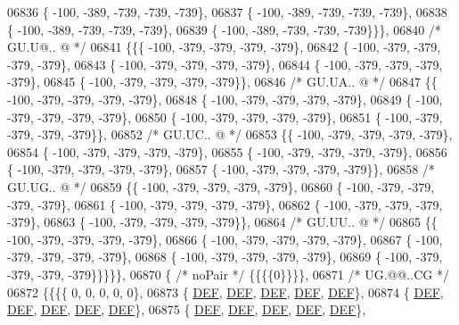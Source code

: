 \begin{DoxyCode}
06836 \{ -100, -389, -739, -739, -739\},
06837 \{ -100, -389, -739, -739, -739\},
06838 \{ -100, -389, -739, -739, -739\},
06839 \{ -100, -389, -739, -739, -739\}\}\},
06840 \textcolor{comment}{/* GU.U@.. @ */}
06841 \{\{\{ -100, -379, -379, -379, -379\},
06842 \{ -100, -379, -379, -379, -379\},
06843 \{ -100, -379, -379, -379, -379\},
06844 \{ -100, -379, -379, -379, -379\},
06845 \{ -100, -379, -379, -379, -379\}\},
06846 \textcolor{comment}{/* GU.UA.. @ */}
06847 \{\{ -100, -379, -379, -379, -379\},
06848 \{ -100, -379, -379, -379, -379\},
06849 \{ -100, -379, -379, -379, -379\},
06850 \{ -100, -379, -379, -379, -379\},
06851 \{ -100, -379, -379, -379, -379\}\},
06852 \textcolor{comment}{/* GU.UC.. @ */}
06853 \{\{ -100, -379, -379, -379, -379\},
06854 \{ -100, -379, -379, -379, -379\},
06855 \{ -100, -379, -379, -379, -379\},
06856 \{ -100, -379, -379, -379, -379\},
06857 \{ -100, -379, -379, -379, -379\}\},
06858 \textcolor{comment}{/* GU.UG.. @ */}
06859 \{\{ -100, -379, -379, -379, -379\},
06860 \{ -100, -379, -379, -379, -379\},
06861 \{ -100, -379, -379, -379, -379\},
06862 \{ -100, -379, -379, -379, -379\},
06863 \{ -100, -379, -379, -379, -379\}\},
06864 \textcolor{comment}{/* GU.UU.. @ */}
06865 \{\{ -100, -379, -379, -379, -379\},
06866 \{ -100, -379, -379, -379, -379\},
06867 \{ -100, -379, -379, -379, -379\},
06868 \{ -100, -379, -379, -379, -379\},
06869 \{ -100, -379, -379, -379, -379\}\}\}\}\},
06870 \{ \textcolor{comment}{/* noPair */} \{\{\{\{0\}\}\}\},
06871 \textcolor{comment}{/* UG.@@..CG */}
06872 \{\{\{\{    0,    0,    0,    0,    0\},
06873 \{  \mbox{\hyperlink{1_88_84__epars_8h_a397419fc12b37ed479c8abb9d444d843}{DEF}},  \mbox{\hyperlink{1_88_84__epars_8h_a397419fc12b37ed479c8abb9d444d843}{DEF}},  \mbox{\hyperlink{1_88_84__epars_8h_a397419fc12b37ed479c8abb9d444d843}{DEF}},  \mbox{\hyperlink{1_88_84__epars_8h_a397419fc12b37ed479c8abb9d444d843}{DEF}},  \mbox{\hyperlink{1_88_84__epars_8h_a397419fc12b37ed479c8abb9d444d843}{DEF}}\},
06874 \{  \mbox{\hyperlink{1_88_84__epars_8h_a397419fc12b37ed479c8abb9d444d843}{DEF}},  \mbox{\hyperlink{1_88_84__epars_8h_a397419fc12b37ed479c8abb9d444d843}{DEF}},  \mbox{\hyperlink{1_88_84__epars_8h_a397419fc12b37ed479c8abb9d444d843}{DEF}},  \mbox{\hyperlink{1_88_84__epars_8h_a397419fc12b37ed479c8abb9d444d843}{DEF}},  \mbox{\hyperlink{1_88_84__epars_8h_a397419fc12b37ed479c8abb9d444d843}{DEF}}\},
06875 \{  \mbox{\hyperlink{1_88_84__epars_8h_a397419fc12b37ed479c8abb9d444d843}{DEF}},  \mbox{\hyperlink{1_88_84__epars_8h_a397419fc12b37ed479c8abb9d444d843}{DEF}},  \mbox{\hyperlink{1_88_84__epars_8h_a397419fc12b37ed479c8abb9d444d843}{DEF}},  \mbox{\hyperlink{1_88_84__epars_8h_a397419fc12b37ed479c8abb9d444d843}{DEF}},  \mbox{\hyperlink{1_88_84__epars_8h_a397419fc12b37ed479c8abb9d444d843}{DEF}}\},

\end{DoxyCode}

